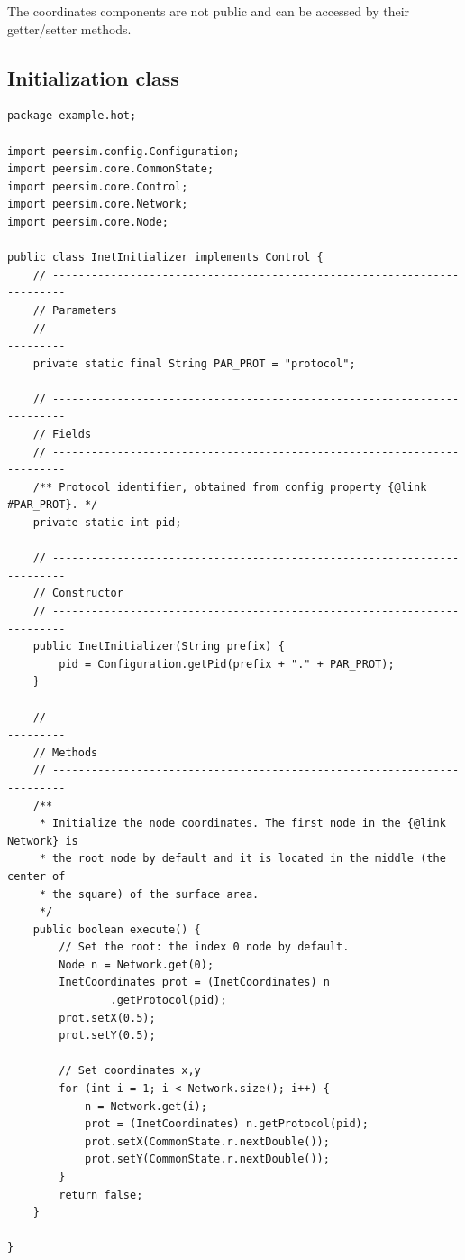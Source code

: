 \documentclass[a4paper,12pt]{article}
\begin{document}
The coordinates components are not public and can be accessed by their
getter/setter methods.

\subsection{Initialization class}
\label{s:init}

\footnotesize
\begin{verbatim}
package example.hot;

import peersim.config.Configuration;
import peersim.core.CommonState;
import peersim.core.Control;
import peersim.core.Network;
import peersim.core.Node;

public class InetInitializer implements Control {
    // ------------------------------------------------------------------------
    // Parameters
    // ------------------------------------------------------------------------
    private static final String PAR_PROT = "protocol";

    // ------------------------------------------------------------------------
    // Fields
    // ------------------------------------------------------------------------
    /** Protocol identifier, obtained from config property {@link #PAR_PROT}. */
    private static int pid;

    // ------------------------------------------------------------------------
    // Constructor
    // ------------------------------------------------------------------------
    public InetInitializer(String prefix) {
        pid = Configuration.getPid(prefix + "." + PAR_PROT);
    }

    // ------------------------------------------------------------------------
    // Methods
    // ------------------------------------------------------------------------
    /**
     * Initialize the node coordinates. The first node in the {@link Network} is
     * the root node by default and it is located in the middle (the center of
     * the square) of the surface area.
     */
    public boolean execute() {
        // Set the root: the index 0 node by default.
        Node n = Network.get(0);
        InetCoordinates prot = (InetCoordinates) n
                .getProtocol(pid);
        prot.setX(0.5);
        prot.setY(0.5);

        // Set coordinates x,y
        for (int i = 1; i < Network.size(); i++) {
            n = Network.get(i);
            prot = (InetCoordinates) n.getProtocol(pid);
            prot.setX(CommonState.r.nextDouble());
            prot.setY(CommonState.r.nextDouble());
        }
        return false;
    }

}
\end{verbatim}
\normalsize
\end{document}
